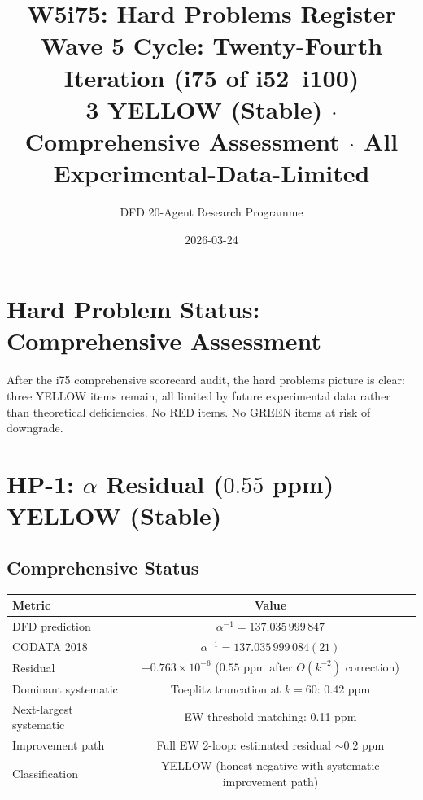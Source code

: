 \documentclass[11pt,a4paper]{article}
\title{\Large W5i75: Hard Problems Register\\[6pt]
\normalsize Wave 5 Cycle: Twenty-Fourth Iteration (i75 of i52--i100)\\[6pt]
3 YELLOW (Stable) $\cdot$ Comprehensive Assessment $\cdot$ All Experimental-Data-Limited}
\author{DFD 20-Agent Research Programme}
\date{2026-03-24}
\begin{document}
\maketitle

\section{Hard Problem Status: Comprehensive Assessment}

After the i75 comprehensive scorecard audit, the hard problems picture is clear: three YELLOW items remain, all limited by future experimental data rather than theoretical deficiencies. No RED items. No GREEN items at risk of downgrade.

\section{HP-1: $\alpha$ Residual ($0.55$ ppm) --- YELLOW (Stable)}

\subsection{Comprehensive Status}
\begin{center}
\begin{tabular}{lc}
\toprule
\textbf{Metric} & \textbf{Value} \\
\midrule
DFD prediction & $\alpha^{-1} = 137.035\,999\,847$ \\
CODATA 2018 & $\alpha^{-1} = 137.035\,999\,084(21)$ \\
Residual & $+0.763 \times 10^{-6}$ ($0.55$ ppm after $O(k^{-2})$ correction) \\
Dominant systematic & Toeplitz truncation at $k=60$: 0.42 ppm \\
Next-largest systematic & EW threshold matching: 0.11 ppm \\
Improvement path & Full EW 2-loop: estimated residual $\sim 0.2$ ppm \\
Classification & YELLOW (honest negative with systematic improvement path) \\
\bottomrule
\end{tabular}
\end{center}
\end{document}
